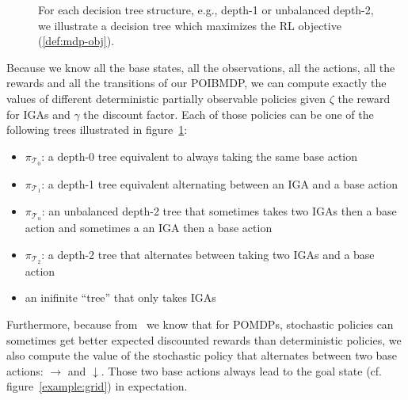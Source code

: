 \begin{figure}[htbp]
    \caption{For each decision tree structure, e.g., depth-1 or unbalanced depth-2, we illustrate a decision tree which maximizes the RL objective (\ref{def:mdp-obj}).}
    \label{fig:optimal-policy-trees}
\end{figure}

Because we know all the base states, all the observations, all the actions, all the rewards and all the transitions of our POIBMDP, we can compute exactly the values of different deterministic partially observable policies given $\zeta$ the reward for IGAs and $\gamma$ the discount factor.
Each of those policies can be one of the following trees illustrated in figure~\ref{fig:optimal-policy-trees}: 

\begin{itemize}
    \item $\pi_{\mathcal{T}_0}$: a depth-0 tree equivalent to always taking the same base action 
    \item $\pi_{\mathcal{T}_1}$: a depth-1 tree equivalent alternating between an IGA and a base action 
    \item $\pi_{\mathcal{T}_u}$: an unbalanced depth-2 tree that sometimes takes two IGAs then a base action and sometimes a an IGA then a base action
    \item $\pi_{\mathcal{T}_2}$: a depth-2 tree that alternates between taking two IGAs and a base action
    \item an inifinite ``tree'' that only takes IGAs
\end{itemize}
Furthermore, because from~\cite{learning-pomdp} we know that for POMDPs, stochastic policies can sometimes get better expected discounted rewards than deterministic policies, we also compute the value of the stochastic policy that alternates between two base actions: $\rightarrow$ and $\downarrow$.
Those two base actions always lead to the goal state (cf. figure~\ref{example:grid}) in expectation.

